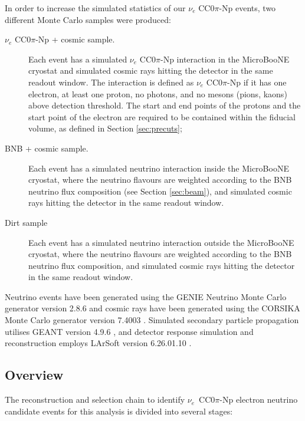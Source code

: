 In order to increase the simulated statistics of our $\nu_e$ CC0$\pi$-Np events, two different Monte Carlo samples were produced:
\begin{description}
\item[$\nu_{e}$ CC0$\pi$-Np + cosmic sample.] Each event has a simulated $\nu_{e}$ CC0$\pi$-Np interaction in the MicroBooNE cryostat and simulated cosmic rays hitting the detector in the same readout window. {The interaction is defined as $\nu_{e}$ CC0$\pi$-Np if it has one electron, at least one proton, no photons, and no mesons (pions, kaons) above detection threshold. The start and end points of the protons and the start point of the electron are required to be contained within the fiducial volume, as defined in Section \ref{sec:precuts}};
\item[BNB + cosmic sample.] Each event has a simulated neutrino interaction inside the MicroBooNE cryostat, where the neutrino flavours are weighted according to the BNB neutrino flux composition (see Section \ref{sec:beam}), and simulated cosmic rays hitting the detector in the same readout window.
\item[Dirt sample] {Each event has a simulated neutrino interaction outside the MicroBooNE cryostat, where the neutrino flavours are weighted according to the BNB neutrino flux composition, and simulated cosmic rays hitting the detector in the same readout window.}
\end{description}

Neutrino events have been generated using the GENIE Neutrino Monte Carlo generator version 2.8.6 \cite{Andreopoulos:2009rq} and cosmic rays have been generated using the CORSIKA Monte Carlo generator version 7.4003 \cite{Heck:1998vt}. Simulated secondary particle propagation utilises GEANT version 4.9.6 \cite{Brun:1994aa}, and detector response simulation and reconstruction employs LArSoft version 6.26.01.10 \cite{Church:2013hea}.

\subsection{Overview}
The reconstruction and selection chain to identify $\nu_{e}$~CC0$\pi$-Np electron neutrino candidate events for this analysis is divided into several stages:

